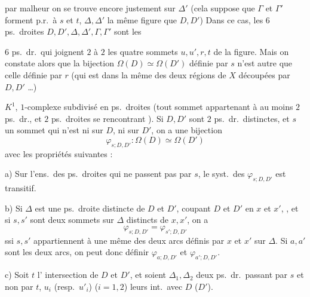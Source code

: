 \documentclass[11pt,a4paper]{article}
\begin{document}

par malheur on se trouve encore justement sur $\Delta'$ (cela suppose que $\Gamma$ et $\Gamma'$ forment p.r.\ à $s$ et $t$, $\Delta, \Delta'$ la même figure que  $D, D'$) Dans ce cas, les $6$ ps.\ droites $D, D', \Delta, \Delta', \Gamma, \Gamma'$ sont les

$6$ ps.\ dr.\ qui joignent $2$ à $2$ les quatre sommets $u, u', r, t$ de la figure. Mais on constate alors que la bijection  $\Omega(D) \simeq \Omega(D')$ définie par $s$ n'est autre que celle définie par $r$ (qui est dans la même des deux régions de $X$ découpées par $D, D'$ \ldots)


$K^{1}$, $1$-complexe subdivisé en ps.\ droites (tout sommet appartenant à au moins $2$ ps.\ dr., et $2$ ps.\ droites se rencontrant ). Si $D, D'$ sont $2$ ps.\ dr.\ distinctes, et $s$ un sommet qui n'est ni sur $D$, ni sur $D'$, on a une bijection
\[
\varphi_{s;D,D'} : \Omega(D) \simeq \Omega(D')
\]
avec les propriétés suivantes :

a) Sur l'ens.\ des ps.\ droites  qui ne passent pas par $s$, le syst.\ des $\varphi_{s;D,D'}$ est  transitif.

b) Si $\Delta$ est une ps.\ droite distincte de $D$ et $D'$, coupant $D$ et $D'$ en $x$ et $x'$, , et si $s, s'$ sont deux sommets sur $\Delta$ distincts de $x, x'$,  \struck{\ill{}} on a
\[
\varphi_{s;D,D'} = \varphi_{s';D,D'}
\]
ssi $s, s'$ appartiennent à une même des deux arcs définis par $x$ et $x'$ sur $\Delta$. Si $a, a'$ sont les deux arcs, on peut donc définir $\varphi_{a;D,D'}$ et $\varphi_{a';D,D'}$.

c) Soit $t$ l'\ill{} intersection de $D$ et $D'$, et soient $\Delta_1, \Delta_2$  deux ps.\ dr.\ passant par $s$ et non par $t$, \struck{\ill{}} $u_i$ (resp.\ $u'_i$) ($i = 1, 2$) leurs int.\ avec $D$ ($D'$).
\end{document}
